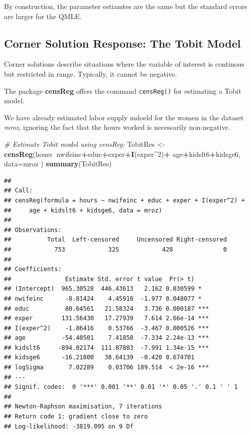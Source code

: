 \documentclass[]{book}
\newenvironment{Shaded}{\begin{snugshade}}{\end{snugshade}}
\newcommand{\CommentTok}[1]{\textcolor[rgb]{0.56,0.35,0.01}{\textit{#1}}}
\newcommand{\DataTypeTok}[1]{\textcolor[rgb]{0.13,0.29,0.53}{#1}}
\newcommand{\DecValTok}[1]{\textcolor[rgb]{0.00,0.00,0.81}{#1}}
\newcommand{\KeywordTok}[1]{\textcolor[rgb]{0.13,0.29,0.53}{\textbf{#1}}}
\newcommand{\NormalTok}[1]{#1}
\newcommand{\OperatorTok}[1]{\textcolor[rgb]{0.81,0.36,0.00}{\textbf{#1}}}
\newcommand{\StringTok}[1]{\textcolor[rgb]{0.31,0.60,0.02}{#1}}
\begin{document}
By construction, the parameter estiamtes are the same but the standard errors are larger for the QMLE.

\hypertarget{corner-solution-response-the-tobit-model}{%
\subsection{Corner Solution Response: The Tobit Model}\label{corner-solution-response-the-tobit-model}}

Corner solutions describe situations where the variable of interest is continous but restricted in range. Typically, it cannot be negative.

The package \textbf{censReg} offers the command \texttt{censReg()} for estimating a Tobit model.

We have already estimated labor supply mdoeld for the women in the dataset \emph{mroz}, ignoring the fact that the hours worked is necessarily non-negative.

\begin{Shaded}
\begin{Highlighting}[]
\CommentTok{# Estimate Tobit model using censReg:}
\NormalTok{TobitRes <-}\StringTok{ }\KeywordTok{censReg}\NormalTok{(hours}\OperatorTok{~}\NormalTok{nwifeinc}\OperatorTok{+}\NormalTok{educ}\OperatorTok{+}\NormalTok{exper}\OperatorTok{+}\KeywordTok{I}\NormalTok{(exper}\OperatorTok{^}\DecValTok{2}\NormalTok{)}\OperatorTok{+}\StringTok{ }
\StringTok{                      }\NormalTok{age}\OperatorTok{+}\NormalTok{kidslt6}\OperatorTok{+}\NormalTok{kidsge6, }\DataTypeTok{data=}\NormalTok{mroz )}
\KeywordTok{summary}\NormalTok{(TobitRes)}
\end{Highlighting}
\end{Shaded}

\begin{verbatim}
## 
## Call:
## censReg(formula = hours ~ nwifeinc + educ + exper + I(exper^2) + 
##     age + kidslt6 + kidsge6, data = mroz)
## 
## Observations:
##          Total  Left-censored     Uncensored Right-censored 
##            753            325            428              0 
## 
## Coefficients:
##               Estimate Std. error t value  Pr(> t)    
## (Intercept)  965.30528  446.43613   2.162 0.030599 *  
## nwifeinc      -8.81424    4.45910  -1.977 0.048077 *  
## educ          80.64561   21.58324   3.736 0.000187 ***
## exper        131.56430   17.27939   7.614 2.66e-14 ***
## I(exper^2)    -1.86416    0.53766  -3.467 0.000526 ***
## age          -54.40501    7.41850  -7.334 2.24e-13 ***
## kidslt6     -894.02174  111.87803  -7.991 1.34e-15 ***
## kidsge6      -16.21800   38.64139  -0.420 0.674701    
## logSigma       7.02289    0.03706 189.514  < 2e-16 ***
## ---
## Signif. codes:  0 '***' 0.001 '**' 0.01 '*' 0.05 '.' 0.1 ' ' 1
## 
## Newton-Raphson maximisation, 7 iterations
## Return code 1: gradient close to zero
## Log-likelihood: -3819.095 on 9 Df
\end{verbatim}
\end{document}
